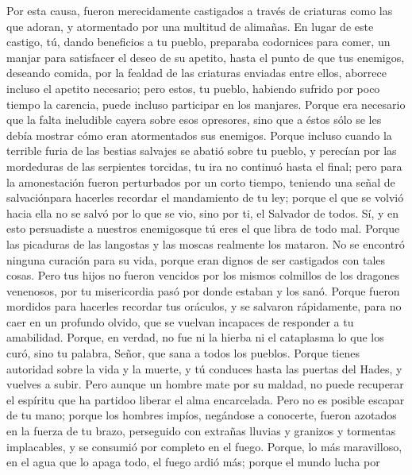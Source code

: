  Por esta causa, fueron merecidamente castigados a través
de criaturas como las que adoran, y atormentado por una multitud de
alimañas.  En lugar de este castigo, tú, dando beneficios
a tu pueblo, preparaba codornices para comer, un manjar para satisfacer
el deseo de su apetito,  hasta el punto de que tus
enemigos, deseando comida, por la fealdad de las criaturas enviadas
entre ellos, aborrece incluso el apetito necesario; pero estos, tu
pueblo, habiendo sufrido por poco tiempo la carencia, puede incluso
participar en los manjares.  Porque era necesario que la
falta ineludible cayera sobre esos opresores, sino que a éstos sólo se
les debía mostrar cómo eran atormentados sus enemigos. 
Porque incluso cuando la terrible furia de las bestias salvajes se
abatió sobre tu pueblo, y perecían por las mordeduras de las serpientes
torcidas, tu ira no continuó hasta el final;  pero para la
amonestación fueron perturbados por un corto tiempo, teniendo una señal
de salvaciónpara hacerles recordar el mandamiento de tu ley;
 porque el que se volvió hacia ella no se salvó por lo que
se vio, sino por ti, el Salvador de todos.  Sí, y en esto
persuadiste a nuestros enemigosque tú eres el que libra de todo mal.
 Porque las picaduras de las langostas y las moscas
realmente los mataron. No se encontró ninguna curación para su vida,
porque eran dignos de ser castigados con tales cosas. 
Pero tus hijos no fueron vencidos por los mismos colmillos de los
dragones venenosos, por tu misericordia pasó por donde estaban y los
sanó.  Porque fueron mordidos para hacerles recordar tus
oráculos, y se salvaron rápidamente, para no caer en un profundo olvido,
que se vuelvan incapaces de responder a tu amabilidad. 
Porque, en verdad, no fue ni la hierba ni el cataplasma lo que los curó,
sino tu palabra, Señor, que sana a todos los pueblos. 
Porque tienes autoridad sobre la vida y la muerte, y tú conduces hasta
las puertas del Hades, y vuelves a subir.  Pero aunque un
hombre mate por su maldad, no puede recuperar el espíritu que ha
partidoo liberar el alma encarcelada.  Pero no es posible
escapar de tu mano;  porque los hombres impíos, negándose
a conocerte, fueron azotados en la fuerza de tu brazo, perseguido con
extrañas lluvias y granizos y tormentas implacables, y se consumió por
completo en el fuego.  Porque, lo más maravilloso, en el
agua que lo apaga todo, el fuego ardió más; porque el mundo lucha por
